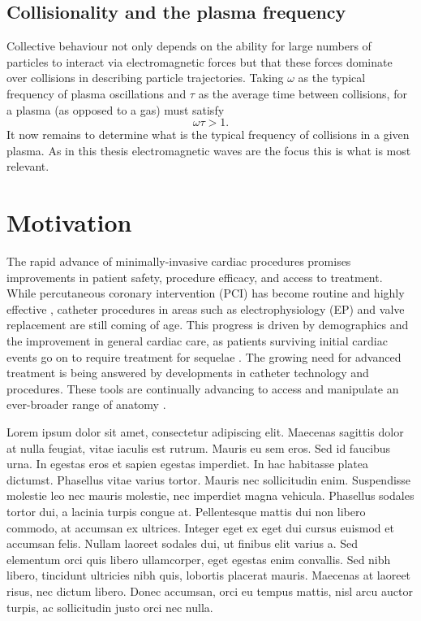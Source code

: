 \subsection{\label{sec:plasma_frequency}Collisionality and the plasma frequency}
Collective behaviour not only depends on the ability for large numbers of particles to interact via electromagnetic forces but that these forces dominate over collisions in describing particle trajectories. Taking $\omega$ as the typical frequency of plasma oscillations and $\tau$ as the average time between collisions, for a plasma (as opposed to a gas) must satisfy
\begin{equation}\label{eq:plasma_frequency_condition}
	\omega\tau > 1.
\end{equation}
It now remains to determine what is the typical frequency of collisions in a given plasma. As in this thesis electromagnetic waves are the focus this is what is most relevant.
\section{Motivation}
The rapid advance of minimally-invasive cardiac procedures promises improvements in patient safety, procedure efficacy, and access to treatment.  While percutaneous coronary intervention (PCI) has become routine and highly effective \cite{bravata_systematic_2007}, catheter procedures in areas such as electrophysiology (EP) and valve replacement are still coming of age.  This progress is driven by demographics and the improvement in general cardiac care, as patients surviving initial cardiac events go on to require treatment for sequelae \cite{foot_demographics_2000}.  The growing need for advanced treatment is being answered by developments in catheter technology and procedures.  These tools are continually advancing to access and manipulate an ever-broader range of anatomy \cite{sousa_new_2005}.

Lorem ipsum dolor sit amet, consectetur adipiscing elit. Maecenas sagittis dolor at nulla feugiat, vitae iaculis est rutrum. Mauris eu sem eros. Sed id faucibus urna. In egestas eros et sapien egestas imperdiet. In hac habitasse platea dictumst. Phasellus vitae varius tortor. Mauris nec sollicitudin enim. Suspendisse molestie leo nec mauris molestie, nec imperdiet magna vehicula. Phasellus sodales tortor dui, a lacinia turpis congue at. Pellentesque mattis dui non libero commodo, at accumsan ex ultrices. Integer eget ex eget dui cursus euismod et accumsan felis. Nullam laoreet sodales dui, ut finibus elit varius a. Sed elementum orci quis libero ullamcorper, eget egestas enim convallis. Sed nibh libero, tincidunt ultricies nibh quis, lobortis placerat mauris. Maecenas at laoreet risus, nec dictum libero. Donec accumsan, orci eu tempus mattis, nisl arcu auctor turpis, ac sollicitudin justo orci nec nulla.

